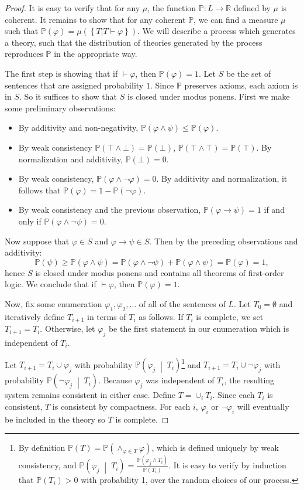 \documentclass[12pt]{article}
\theoremstyle{definition}
\newcommand{\RR}{\mathbb{R}}
\newcommand{\of}[1]{\left(#1\right)}
\newcommand{\bc}[2]{\left\{#1\left|#2\right.\right\}}
\newcommand{\ofc}[2]{\left(#1\;\middle\vert\;#2\right)}
\newcommand{\PP}{\mathbb{P}}
\newcommand{\Pc}[2]{\PP\ofc{#1}{#2}}
\renewcommand{\P}[1]{\mathbb{P}\of{#1}}
\newcommand{\Po}[1]{\mathbb{P}\of{#1}}
\newcommand{\vp}{\varphi}
\begin{document}
\begin{proof}
It is easy to verify that for any $\mu$,
the function $\PP : L \rightarrow \RR$ defined by $\mu$
is coherent.
It remains to show that for any coherent $\PP$,
we can find a measure $\mu$ such that
$\P{\vp} = \mu\of{\bc{T}{T \vdash \vp}}$.
We will describe a process which generates a theory,
such that the distribution of theories
generated by the process reproduces $\PP$ in the appropriate way.

The first step is showing that if $\vdash \vp$, then $\P{\vp} = 1$.
Let $S$ be the set of sentences that are assigned probability $1$.
Since $\PP$ preserves axioms, each axiom is in $S$.
So it suffices to show that $S$ is closed under modus ponens.
First we make some preliminary observations:
\begin{itemize}
\item By additivity and non-negativity, $\P{\vp \wedge \psi} \leq \P{\vp}$.
\item By weak consistency $\P{\top \wedge \bot}  = \P{\bot}$, $\P{\top \wedge \top} = \P{\top}$.
By normalization and additivity, $\P{\bot} = 0$.
\item By weak consistency, $\P{\vp \wedge \neg \vp} = 0$.
By additivity and normalization, it follows that $\P{\vp} = 1 - \P{\neg \vp}$.
\item By weak consistency and the previous observation,
$\P{\vp \rightarrow \psi} = 1$ if and only if $\P{\vp \wedge \neg \psi} = 0$.
\end{itemize}

Now suppose that $\vp \in S$ and $\vp \rightarrow \psi \in S$.
Then by the preceding observations and additivity:
\[\P{\psi} \geq \P{\vp \wedge \psi} = \P{\vp \wedge \neg \psi} + \P{\vp \wedge \psi} = \P{\vp} = 1,\]
hence $S$ is closed under modus ponens and contains all theorems of first-order logic.
We conclude that if $\vdash \vp$, then $\P{\vp} = 1$.

Now,
fix some enumeration $\vp_1, \vp_2, \ldots$ of all of the sentences of $L$.
Let $T_0 = \emptyset$
and iteratively define $T_{i+1}$ in terms of $T_i$ as follows. 
If $T_i$ is complete, we set $T_{i+1} = T_i$.
Otherwise, let $\vp_j$ be the first statement in our enumeration which is independent of $T_i$.

Let $T_{i+1} = T_i \cup \vp_j$ with probability 
$\Pc{\vp_j}{T_i}$\footnote{
    By definition
    $\P{T} = \P{\wedge_{\vp \in T} \vp}$, which is defined uniquely by weak consistency,
    and $\Pc{\vp_j}{T_i} = \frac{\Po{\vp_j \wedge T_i}}{\Po{T_i}}$. 
    It is easy to verify by induction that $\Po{T_i} > 0$ with probability 1,
    over the random choices of our process.
}
and $T_{i+1} = T_i \cup \neg \vp_j$ with probability $\Pc{\neg \vp_j}{T_i}$.
Because $\vp_j$ was independent of $T_i$, the resulting system remains consistent
in either case.
Define $T = \cup_i T_i$.
Since each $T_i$ is consistent, $T$ is consistent by compactness.
For each $i$, $\vp_i$ or $\neg \vp_i$ will eventually be included in the theory
so $T$ is complete.


\end{proof}
\end{document}
